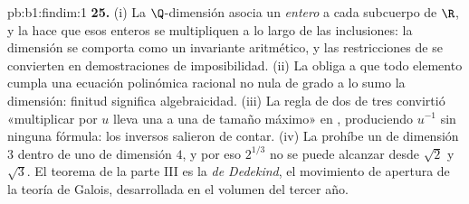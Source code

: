 \begin{solution}{pb:b1:findim:1}
\textbf{25.} (i) La $\Q$-dimensión asocia un \emph{entero} a cada
subcuerpo de $\R$, y la  hace que esos enteros se
multipliquen a lo largo de las inclusiones: la dimensión se comporta
como un invariante aritmético, y las restricciones de
 se convierten en demostraciones de imposibilidad.
(ii) La  obliga a que todo elemento cumpla una
ecuación polinómica racional no nula de grado a lo sumo la
dimensión: finitud significa algebraicidad. (iii) La regla de dos de
tres convirtió «multiplicar por $u$ lleva una  a una
 de tamaño máximo» en , produciendo
$u^{-1}$ sin ninguna fórmula: los inversos salieron de contar.
(iv) La  prohíbe un  de dimensión $3$ dentro de
uno de dimensión $4$, y por eso $2^{1/3}$ no se puede alcanzar desde
$\sqrt2$ y $\sqrt3$. El teorema de la parte III es la \emph{ de Dedekind}, el movimiento de apertura de la teoría de
Galois, desarrollada en el volumen del tercer año.
\end{solution}
